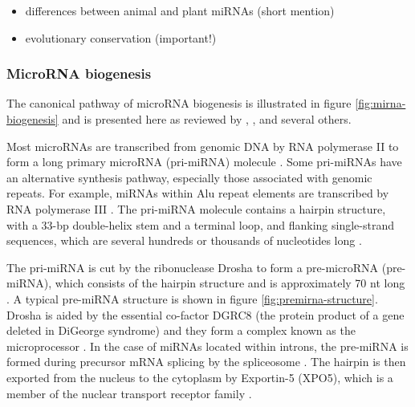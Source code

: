 \begin{itemize}
\item
  differences between animal and plant miRNAs (short mention)
\item
  evolutionary conservation (important!)
\end{itemize}


 



\subsubsection{MicroRNA biogenesis}\label{microrna-biogenesis}

The canonical pathway of microRNA biogenesis is illustrated in figure
\ref{fig:mirna-biogenesis} and is presented here as reviewed by  
\citet{Bartel2004}, \citet{Melo2015}, and several others. 

Most microRNAs are transcribed from genomic DNA by RNA polymerase II to form a
long primary microRNA (pri-miRNA) molecule \citep{Lee2004}. Some pri-miRNAs
have an alternative synthesis pathway, especially those associated with
genomic repeats. For example, miRNAs within Alu repeat elements are
transcribed by RNA polymerase III \citep{Borchert2006}. The pri-miRNA molecule
contains a hairpin structure, with a 33-bp double-helix stem and a terminal
loop, and flanking single-strand sequences, which are several hundreds or
thousands of nucleotides long \citep{Kim2005}.

The pri-miRNA is cut by the ribonuclease Drosha to form%
a pre-microRNA (pre-miRNA), which consists of the hairpin structure and is
approximately 70 nt long \citep{Lee2003}. A typical pre-miRNA structure is
shown in figure \ref{fig:premirna-structure}. Drosha is aided by the essential
co-factor DGRC8 (the protein product of a gene deleted in DiGeorge syndrome)
and they form a complex known as the microprocessor \citep{Gregory2004}. In
the case of miRNAs located within introns, the pre-miRNA is formed during
precursor mRNA splicing by the spliceosome \citep{Ruby2007}. The hairpin is
then exported from the nucleus to the cytoplasm by Exportin-5 (XPO5), which is
a member of the nuclear transport receptor family
\citep{Lund2004}.


